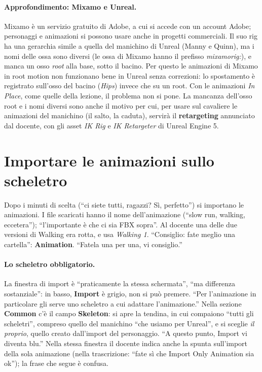 \paragraph{Approfondimento: Mixamo e Unreal.} Mixamo è un servizio gratuito di Adobe, a
cui si accede con un account Adobe; personaggi e animazioni si possono usare anche in
progetti commerciali. Il suo rig ha una gerarchia simile a quella del manichino di
Unreal (Manny e Quinn), ma i nomi delle ossa sono diversi (le ossa di Mixamo hanno il
prefisso \emph{mixamorig:}), e manca un osso \emph{root} alla base, sotto il bacino.
Per questo le animazioni di Mixamo in root motion non funzionano bene in Unreal senza
correzioni: lo spostamento è registrato sull'osso del bacino (\emph{Hips}) invece che su
un root. Con le animazioni \emph{In Place}, come quelle della lezione, il problema non si
pone. La mancanza dell'osso root e i nomi diversi sono anche il motivo per cui, per usare
sul cavaliere le animazioni del manichino (il salto, la caduta), servirà il
\textbf{retargeting} annunciato dal docente, con gli asset \emph{IK Rig} e \emph{IK
Retargeter} di Unreal Engine 5.

\section{Importare le animazioni sullo scheletro}
\label{ue8:sec:importanim}

Dopo i minuti di scelta (``ci siete tutti, ragazzi? Sì, perfetto'') si importano le
animazioni. I file scaricati hanno il nome dell'animazione (``slow run, walking,
eccetera''); ``l'importante è che ci sia FBX sopra''. Al docente una delle due versioni
di Walking era rotta, e usa \emph{Walking 1}. ``Consiglio: fate meglio una cartella'':
\textbf{Animation}. ``Fatela una per una, vi consiglio.''

\paragraph{Lo scheletro obbligatorio.} La finestra di import è ``praticamente la stessa
schermata'', ``ma differenza sostanziale'': in basso, \textbf{Import} è grigio, non si
può premere. ``Per l'animazione in particolare gli serve uno scheletro a cui adattare
l'animazione.'' Nella sezione \textbf{Common} c'è il campo \textbf{Skeleton}: si apre la
tendina, in cui compaiono ``tutti gli scheletri'', compreso quello del manichino ``che
usiamo per Unreal'', e si sceglie \emph{il proprio}, quello creato dall'import del
personaggio. ``A questo punto, Import vi diventa blu.'' Nella stessa finestra il docente
indica anche la spunta sull'import della sola animazione (nella trascrizione: ``fate sì
che Import Only Animation sia ok''); la frase che segue è confusa.

